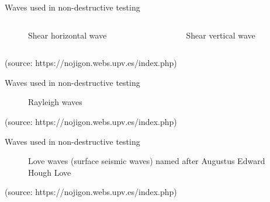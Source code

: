 \documentclass[10pt,aspectratio=169,dvipsnames]{beamer} %
\begin{document}
	\begin{frame}{Waves used in non-destructive testing}
		\begin{columns}[T]
				\begin{column}{0.5\textwidth}
						\centering
						\begin{figure}
								\caption{\alert{Shear horizontal wave}}
							\end{figure}			
					\end{column}
				\begin{column}{0.5\textwidth}
						\centering
						\begin{figure}
								\caption{\alert{Shear vertical wave}}
							\end{figure}			
					\end{column}	
			\end{columns}
	\tiny 
	(source: https://nojigon.webs.upv.es/index.php)
	\end{frame}
	\setcounter{subfigure}{0}
	\begin{frame}{Waves used in non-destructive testing}
		\begin{figure}
				\centering
				\caption{\alert{Rayleigh waves}}		
			\end{figure}			
	\tiny 
	(source: https://nojigon.webs.upv.es/index.php)
	\end{frame}
	\setcounter{subfigure}{0}
	\begin{frame}{Waves used in non-destructive testing}
		\begin{figure}			
				\centering
				\caption{\alert{Love waves} (surface seismic waves) named after Augustus Edward Hough Love}		
			\end{figure}			
	\tiny 
	(source: https://nojigon.webs.upv.es/index.php)
	\end{frame}
\end{document}
